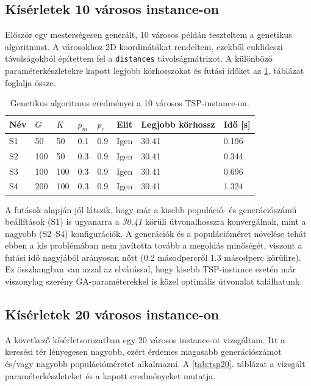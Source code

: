 \documentclass[a4paper,12pt]{article}
\begin{document}
\subsection{Kísérletek 10 városos instance-on}

Először egy mesterségesen generált, 10 városos példán teszteltem a genetikus
algoritmust. A városokhoz 2D koordinátákat rendeltem, ezekből euklideszi
távolságokból építettem fel a \texttt{distances} távolságmátrixot. A különböző
paraméterkészletekre kapott legjobb körhosszokat és futási időket az
\ref{tab:tsp10}. táblázat foglalja össze.

\begin{table}[H]
  \centering
  \begin{tabular}{llllllll}
    \toprule
    Név & $G$ & $K$ & $p_m$ & $p_c$ & Elit & Legjobb körhossz & Idő [s] \\
    \midrule
    S1 & 50  & 50  & 0.1 & 0.9 & Igen & 30.41 & 0.196 \\
    S2 & 100 & 50  & 0.3 & 0.9 & Igen & 30.41 & 0.344 \\
    S3 & 100 & 100 & 0.3 & 0.9 & Igen & 30.41 & 0.696 \\
    S4 & 200 & 100 & 0.3 & 0.9 & Igen & 30.41 & 1.324 \\
    \bottomrule
  \end{tabular}
  \caption{Genetikus algoritmus eredményei a 10 városos TSP-instance-on.}
  \label{tab:tsp10}
\end{table}

A futások alapján jól látszik, hogy már a kisebb populáció- és
generációszámú beállítások (S1) is ugyanarra a \emph{30.41} körüli
útvonalhosszra konvergálnak, mint a nagyobb (S2--S4) konfigurációk.
A generációk és a populációméret növelése tehát ebben a kis problémában
nem javította tovább a megoldás minőségét, viszont a futási idő nagyjából
arányosan nőtt (0.2 másodpercről 1.3 másodperc körülire). Ez összhangban van
azzal az elvárással, hogy kisebb TSP-instance esetén már viszonylag szerény
GA-paraméterekkel is közel optimális útvonalat találhatunk.

\subsection{Kísérletek 20 városos instance-on}

A következő kísérletsorozatban egy 20 városos instance-ot vizsgáltam.
Itt a keresési tér lényegesen nagyobb, ezért érdemes magasabb
generációszámot és/vagy nagyobb populációméretet alkalmazni. A
\ref{tab:tsp20}. táblázat a vizsgált paraméterkészleteket és a kapott
eredményeket mutatja.
\end{document}
